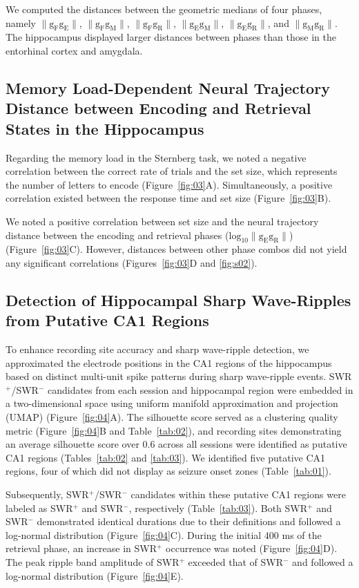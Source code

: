 We computed the distances between the geometric medians of four phases, namely $\mathrm{\lVert g_{F}g_{E} \rVert}$, $\mathrm{\lVert g_{F}g_{M} \rVert}$, $\mathrm{\lVert g_{F}g_{R} \rVert}$, $\mathrm{\lVert g_{E}g_{M} \rVert}$, $\mathrm{\lVert g_{E}g_{R} \rVert}$, and $\mathrm{\lVert g_{M}g_{R} \rVert}$. The hippocampus displayed larger distances between phases than those in the entorhinal cortex and amygdala.

\subsection{Memory Load-Dependent Neural Trajectory Distance between Encoding and Retrieval States in the Hippocampus}

Regarding the memory load in the Sternberg task, we noted a negative correlation between the correct rate of trials and the set size, which represents the number of letters to encode (Figure~\ref{fig:03}A). Simultaneously, a positive correlation existed between the response time and set size (Figure~\ref{fig:03}B).

We noted a positive correlation between set size and the neural trajectory distance between the encoding and retrieval phases ($\mathrm{log_{10}\lVert g_{E}g_{R} \rVert}$) (Figure~\ref{fig:03}C). However, distances between other phase combos did not yield any significant correlations (Figures~\ref{fig:03}D and \ref{fig:s02}).

\subsection{Detection of Hippocampal Sharp Wave-Ripples from Putative CA1 Regions}
To enhance recording site accuracy and sharp wave-ripple detection, we approximated the electrode positions in the CA1 regions of the hippocampus based on distinct multi-unit spike patterns during sharp wave-ripple events. SWR$^+$/SWR$^-$ candidates from each session and hippocampal region were embedded in a two-dimensional space using uniform manifold approximation and projection (UMAP) (Figure~\ref{fig:04}A). The silhouette score served as a clustering quality metric (Figure~\ref{fig:04}B and Table~\ref{tab:02}), and recording sites demonstrating an average silhouette score over 0.6 across all sessions were identified as putative CA1 regions (Tables~\ref{tab:02} and \ref{tab:03}). We identified five putative CA1 regions, four of which did not display as seizure onset zones (Table~\ref{tab:01}).

Subsequently, SWR$^+$/SWR$^-$ candidates within these putative CA1 regions were labeled as SWR$^+$ and SWR$^-$, respectively (Table~\ref{tab:03}). Both SWR$^+$ and SWR$^-$ demonstrated identical durations due to their definitions and followed a log-normal distribution (Figure~\ref{fig:04}C). During the initial 400 ms of the retrieval phase, an increase in SWR$^+$ occurrence was noted (Figure~\ref{fig:04}D). The peak ripple band amplitude of SWR$^+$ exceeded that of SWR$^-$ and followed a log-normal distribution (Figure~\ref{fig:04}E).

